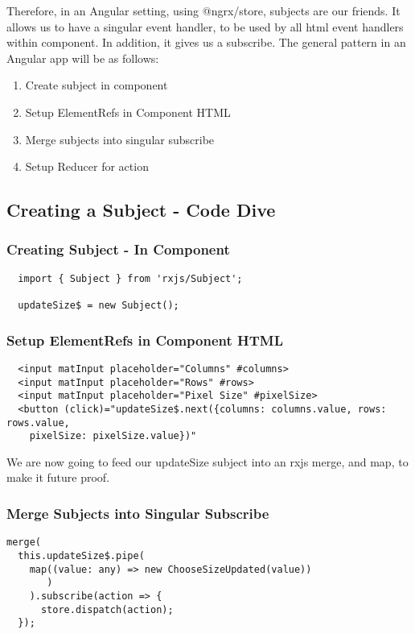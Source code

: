 Therefore, in an Angular setting, using @ngrx/store, subjects are our friends. It
allows us to have a singular event handler, to be used by all html event handlers
within component. In addition, it gives us a subscribe. The general pattern in
an Angular app will be as follows:
\begin{enumerate}
  \item Create subject in component
  \item Setup ElementRefs in Component HTML
  \item Merge subjects into singular subscribe
  \item Setup Reducer for action
\end{enumerate}

\subsection{ Creating a Subject - Code Dive }

\subsubsection{ Creating Subject - In Component }
\begin{lstlisting}
  import { Subject } from 'rxjs/Subject';

  updateSize$ = new Subject();
\end{lstlisting}

\subsubsection{ Setup ElementRefs in Component HTML }
\begin{verbatim}
  <input matInput placeholder="Columns" #columns>
  <input matInput placeholder="Rows" #rows>
  <input matInput placeholder="Pixel Size" #pixelSize>
  <button (click)="updateSize$.next({columns: columns.value, rows: rows.value,
    pixelSize: pixelSize.value})"
\end{verbatim}

We are now going to feed our updateSize subject into an rxjs merge, and map,
to make it future proof.

\subsubsection{ Merge Subjects into Singular Subscribe }

\begin{lstlisting}
merge(
  this.updateSize$.pipe(
    map((value: any) => new ChooseSizeUpdated(value))
       )
    ).subscribe(action => {
      store.dispatch(action);
  });
\end{lstlisting}

